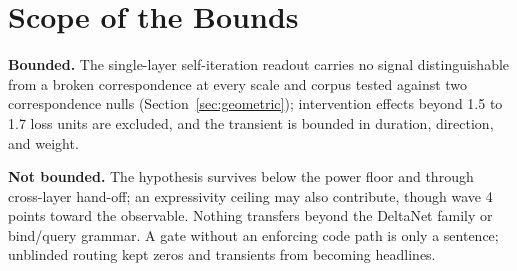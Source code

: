 \section{Scope of the Bounds}
\label{sec:scope}

\textbf{Bounded.} The single-layer self-iteration readout carries no
signal distinguishable from a broken correspondence at every scale and
corpus tested against two correspondence nulls
(Section~\ref{sec:geometric}); %
intervention effects beyond 1.5 to 1.7 loss units are excluded,
and the transient is bounded in duration, direction, and weight.

\textbf{Not bounded.} The hypothesis survives below the power floor and
through cross-layer hand-off; an expressivity ceiling
\citep{grazzi2024unlocking} may also contribute, though wave 4 points
toward the observable. %
Nothing transfers beyond the DeltaNet family or bind/query grammar. A gate
without an enforcing code path is only a sentence; unblinded routing kept
zeros and transients from becoming headlines. %
